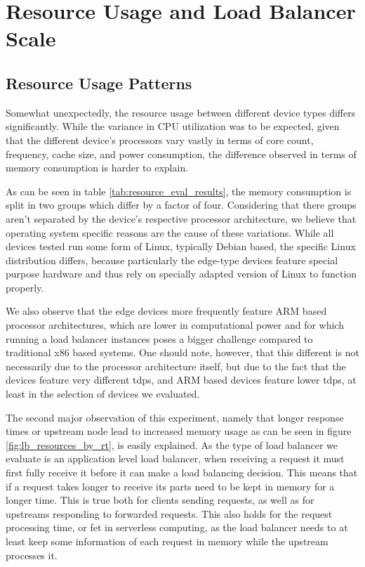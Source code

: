 \documentclass[draft,final]{vutinfth} %
\begin{document}
\section{Resource Usage and Load Balancer Scale}
\subsection{Resource Usage Patterns}
Somewhat unexpectedly, the resource usage between different device types differs significantly.
While the variance in CPU utilization was to be expected, given that the different device's processors vary vastly in terms of core count, frequency, cache size, and power consumption, the difference observed in terms of memory consumption is harder to explain.

As can be seen in table \ref{tab:resource_eval_results}, the memory consumption is split in two groups which differ by a factor of four. Considering that there groups aren't separated by the device's respective processor architecture, we believe that operating system specific reasons are the cause of these variations.
While all devices tested run some form of Linux, typically Debian based, the specific Linux distribution differs, because particularly the edge-type devices feature special purpose hardware and thus rely on specially adapted version of Linux to function properly.

We also observe that the edge devices more frequently feature ARM based processor architectures, which are lower in computational power and for which running a load balancer instances poses a bigger challenge compared to traditional x86 based systems. One should note, however, that this different is not necessarily due to the processor architecture itself, but due to the fact that the devices feature very different \glspl{tdp}, and ARM based devices feature lower \glspl{tdp}, at least in the selection of devices we evaluated.

The second major observation of this experiment, namely that longer response times or upstream node lead to increased memory usage as can be seen in figure \ref{fig:lb_resources_by_rt}, is  easily explained.
As the type of load balancer we evaluate is an application level load balancer, when receiving a request it must first fully receive it before it can make a load balancing decision.
This means that if a request takes longer to receive its parts need to be kept in memory for a longer time.
This is true both for clients sending requests, as well as for upstreams responding to forwarded requests.
This also holds for the request processing time, or \gls{fet} in serverless computing, as the load balancer needs to at least keep some information of each request in memory while the upstream processes it.
\end{document}

